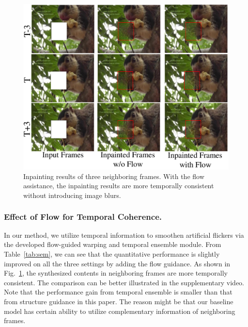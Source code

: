\begin{figure}[t]
	\centering
	\includegraphics[width=0.9\columnwidth]{flow_vis} %
	\caption{Inpainting results of three neighboring frames. With the flow assistance, the inpainting results are more temporally consistent without introducing image blurs. }
	\label{flow_vis}
\end{figure}

\subsubsection{Effect of Flow for Temporal Coherence.}

In our method, we utilize temporal information to smoothen artificial flickers via the developed flow-guided warping and temporal ensemble module. 
From Table~\ref{tab:sem}, we can see that the quantitative performance is slightly improved on all the three settings by adding the flow guidance. 
As shown in Fig.~\ref{flow_vis}, the synthesized contents in neighboring frames are more temporally consistent.
The comparison can be better illustrated in the supplementary video.
Note that the performance gain from temporal ensemble is smaller than that from structure guidance in this paper.
The reason might be that our baseline model has certain ability to utilize complementary information of neighboring frames.

 














 

